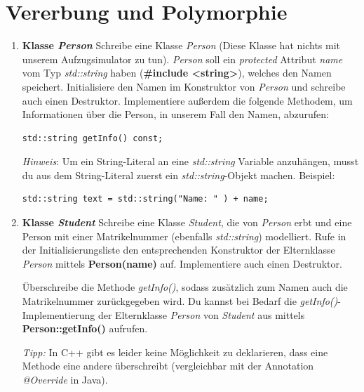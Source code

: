 

\newcommand{\tag}{3}

\cppSetTitle


	
\cppSetHeaderAndMakeTitle  

\vspace{5mm}

\section{Vererbung und Polymorphie}
\begin{enumerate}
\item \textbf{Klasse \emph{Person}}
Schreibe eine Klasse \emph{Person} (Diese Klasse hat nichts mit unserem Aufzugsimulator zu tun).
\emph{Person} soll ein \emph{protected} Attribut \emph{name} vom Typ \emph{std::string} haben (\textbf{\#include <string>}), welches den Namen speichert. 
Initialisiere den Namen im Konstruktor von \emph{Person} und schreibe auch einen Destruktor.
Implementiere außerdem die folgende Methodem, um Informationen über die Person, in unserem Fall den Namen, abzurufen:
\begin{lstlisting}
std::string getInfo() const;
\end{lstlisting}

\emph{Hinweis}: Um ein String-Literal an eine \emph{std::string} Variable anzuhängen, musst du aus dem String-Literal zuerst ein \emph{std::string}-Objekt machen.
Beispiel:
\begin{lstlisting}
std::string text = std::string("Name: " ) + name;
\end{lstlisting}

\item \textbf{Klasse \emph{Student}}
Schreibe eine Klasse \emph{Student}, die von \emph{Person} erbt und eine Person mit einer Matrikelnummer (ebenfalls \emph{std::string}) modelliert.
Rufe in der Initialisierungsliste den entsprechenden Konstruktor der Elternklasse \emph{Person} mittels \textbf{Person(name)} auf.
Implementiere auch einen Destruktor. 

Überschreibe die Methode \emph{getInfo()}, sodass zusätzlich zum Namen auch die Matrikelnummer zurückgegeben wird.
Du kannst bei Bedarf die \emph{getInfo()}-Implementierung der Elternklasse \emph{Person} von \emph{Student} aus mittels \textbf{Person::getInfo()} aufrufen.

\emph{Tipp:}
In C++ gibt es leider keine Möglichkeit zu deklarieren, dass eine Methode eine andere überschreibt (vergleichbar mit der Annotation \emph{@Override} in Java).


\end{enumerate}
